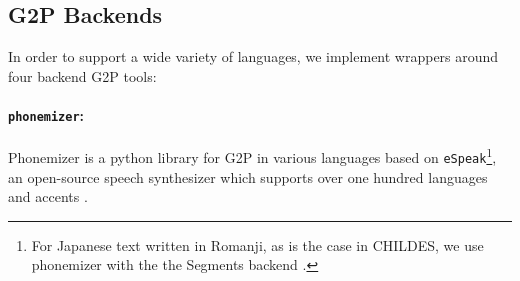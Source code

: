 



\subsection{G2P Backends}\label{sec:13-backends}

In order to support a wide variety of languages, we implement wrappers around four backend G2P tools:


\paragraph{\texttt{phonemizer}:} Phonemizer \citep{Bernard2021} is a python library for G2P in various languages based on \texttt{eSpeak}\footnote{For Japanese text written in Romanji, as is the case in CHILDES, we use phonemizer with the the Segments backend \citep{robert_forkel_2019_3549784}.}, an open-source speech synthesizer which supports over one hundred languages and accents \citep{Dunn2019}.

